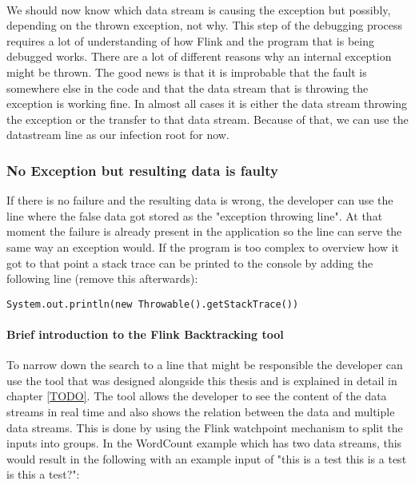 \paragraph{} We should now know which data stream is causing the exception but possibly, depending on the thrown exception, not why. This step of the debugging process requires a lot of understanding of how Flink and the program that is being debugged works. There are a lot of different reasons why an internal exception might be thrown. The good news is that it is improbable that the fault is somewhere else in the code and that the data stream that is throwing the exception is working fine. In almost all cases it is either the data stream throwing the exception or the transfer to that data stream. Because of that, we can use the datastream line as our infection root for now.

\subsubsection{No Exception but resulting data is faulty}
If there is no failure and the resulting data is wrong, the developer can use the line where the false data got stored as the "exception throwing line". At that moment the failure is already present in the application so the line can serve the same way an exception would. If the program is too complex to overview how it got to that point a stack trace can be printed to the console by adding the following line (remove this afterwards):
\begin{lstlisting}[caption={Create Stacktrace}]
 System.out.println(new Throwable().getStackTrace())
\end{lstlisting}

\paragraph{Brief introduction to the Flink Backtracking tool}
\label{mdfBriefIntroTool}

To narrow down the search to a line that might be responsible the developer can use the tool that was designed alongside this thesis and is explained in detail in chapter \ref{TODO}. The tool allows the developer to see the content of the data streams in real time and also shows the relation between the data and multiple data streams. This is done by using the Flink watchpoint mechanism to split the inputs into groups. In the WordCount example which has two data streams, this would result in the following with an example input of "this is a test this is a test is this a test?":

